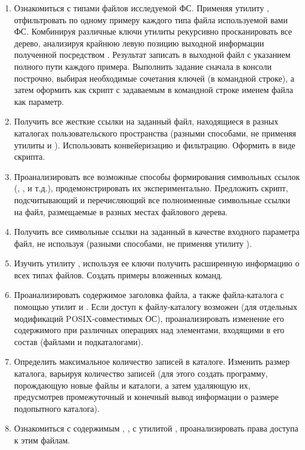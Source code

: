\renewcommand{\labelenumii}{\theenumii}
\renewcommand{\theenumii}{\theenumi.\arabic{enumii}.}

\begin{enumerate}
	\item Ознакомиться с типами файлов исследуемой ФС. Применяя утилиту , отфильтровать по одному примеру каждого типа файла используемой вами ФС. Комбинируя различные ключи утилиты рекурсивно просканировать все дерево, анализируя крайнюю левую позицию выходной информации полученной посредством . Результат записать в выходной файл с указанием полного пути каждого примера. Выполнить задание сначала в консоли построчно, выбирая необходимые сочетания ключей (в командной строке), а затем оформить как скрипт с задаваемым в командной строке именем файла как параметр.
	\item Получить все жесткие ссылки на заданный файл, находящиеся в разных каталогах пользовательского пространства (разными способами, не применяя утилиты  и ). Использовать конвейеризацию и фильтрацию. Оформить в виде скрипта.
	\item Проанализировать все возможные способы формирования символьных ссылок (, ,  и т.д.), продемонстрировать их экспериментально. Предложить скрипт, подсчитывающий и перечисляющий все полноименные символьные ссылки на файл, размещаемые в разных местах файлового дерева.
	\item Получить все символьные ссылки на заданный в качестве входного параметра файл, не используя  (разными способами, не применяя утилиту ).
	\item Изучить утилиту , используя ее ключи получить расширенную информацию о всех типах файлов. Создать примеры вложенных команд.
	\item Проанализировать содержимое заголовка файла, а также файла-каталога с помощью утилит  и . Если доступ к файлу-каталогу возможен (для отдельных модификаций POSIX-совместимых ОС), проанализировать изменение его содержимого при различных операциях над элементами, входящими в его состав (файлами и подкаталогами).
	\item Определить максимальное количество записей в каталоге. Изменить размер каталога, варьируя количество записей (для этого создать программу, порождающую новые файлы и каталоги, а затем удаляющую их, предусмотрев промежуточный и конечный вывод информации о размере подопытного каталога).
	\item Ознакомиться с содержимым , , с утилитой , проанализировать права доступа к этим файлам.

\end{enumerate}
